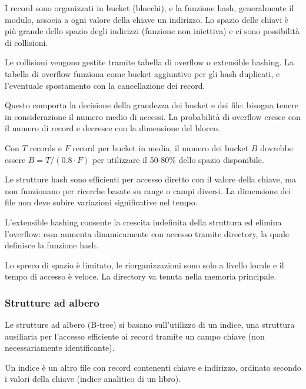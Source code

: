 I record sono organizzati in bucket (blocchi), e la funzione hash, generalmente il modulo, associa a ogni valore della chiave un indirizzo. Lo spazio delle chiavi è più grande dello spazio degli indirizzi (funzione non iniettiva) e ci sono possibilità di collisioni.

Le collisioni vengono gestite tramite tabella di overflow o extensible hashing. La tabella di overflow funziona come bucket aggiuntivo per gli hash duplicati, e l'eventuale spostamento con la cancellazione dei record.

Questo comporta la decisione della grandezza dei bucket e dei file: bisogna tenere in considerazione il numero medio di accessi. La probabilità di overflow cresce con il numero di record e decresce con la dimensione del blocco. 

Con $T$ records e $F$ record per bucket in media, il numero dei bucket $B$ dovrebbe essere $B = T / (0.8 \cdot F)$ per utilizzare il 50-80\% dello spazio disponibile.

Le strutture hash sono efficienti per accesso diretto con il valore della chiave, ma non funzionano per ricerche basate su range o campi diversi. La dimensione dei file non deve subire variazioni significative nel tempo.

L'extensible hashing consente la crescita indefinita della struttura ed elimina l'overflow: essa aumenta dinamicamente con accesso tramite directory, la quale definisce la funzione hash. 

Lo spreco di spazio è limitato, le riorganizzazioni sono solo a livello locale e il tempo di accesso è veloce. La directory va tenuta nella memoria principale.

\subsubsection{Strutture ad albero}
Le strutture ad albero (B-tree) si basano sull'utilizzo di un indice, una struttura ausiliaria per l'accesso efficiente ai record tramite un campo chiave (non necessariamente identificante).

Un indice è un altro file con record contenenti chiave e indirizzo, ordinato secondo i valori della chiave (indice analitico di un libro).






